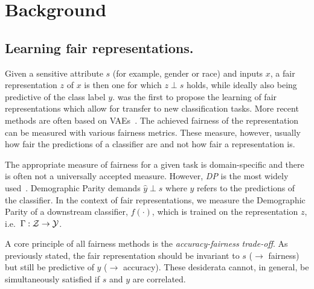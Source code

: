 \section{Background}\label{sec:background}

\subsection{Learning fair representations.}
Given a sensitive attribute $s$ (for example, gender or race) and inputs $x$, a fair
representation $z$ of $x$ is then one for which $z \perp s$ holds, while ideally
also being predictive of the class label $y$. 
%
\citet{zemel2013learning} was the first to propose the learning of fair representations which allow
for transfer to new classification tasks.
%
More recent methods are often based on
\acfp{VAE}~\citep{kingma2013auto,louizos2016variational,edwards2016censoring,beutel2017data}. The
achieved fairness of the representation can be measured with various fairness metrics. These
measure, however, usually how fair the predictions of a classifier are and not how fair a
representation is.

The appropriate measure of fairness for a given task is domain-specific \citep{liu2018delayed} and
there is often not a universally accepted measure. 
%
However, \emph{\ac{DP}} is the most widely
used~\citep{louizos2016variational,edwards2016censoring,beutel2017data}. Demographic Parity demands
$\hat{y} \perp s$ where $\hat{y}$ refers to the predictions of the classifier. 
%
In the context of fair representations, we measure the Demographic Parity of a downstream
classifier, $f(\cdot )$, which is trained on the representation $z$, i.e.\  $\Gamma: {\mathcal{Z}} \to {\mathcal{Y}}$.

A core principle of all fairness methods is the \emph{accuracy-fairness trade-off}.
%
As previously stated, the fair representation should be invariant to $s$ ($\to$ fairness) but still
be predictive of $y$ ($\to$ accuracy). These desiderata cannot, in general, be simultaneously
satisfied if $s$ and $y$ are correlated.

